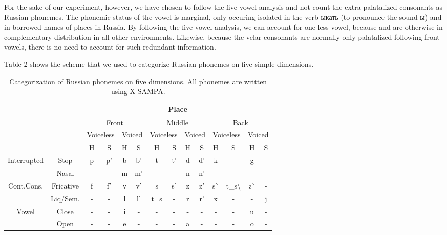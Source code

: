 \documentclass[11pt,a4paper]{article}
\begin{document}
For the sake of our experiment, however, we have chosen to follow the
five-vowel analysis and not count the extra palatalized consonants
as Russian phonemes. The phonemic status of the vowel \textipa{/\textbari/}
is marginal, only occuring isolated in the verb \foreignlanguage{russian}{ыкать}
(to pronounce the sound \foreignlanguage{russian}{ы}) and in borrowed names
of places in Russia. By following the five-vowel analysis, we can account for
one less vowel, because \textipa{/\textbari/} and  are otherwise
in complementary distribution in all other environments. Likewise, because
the velar consonants are normally only palatalized following front vowels,
there is no need to account for such redundant information.

Table 2 shows the scheme that we used to categorize Russian phonemes
on five simple dimensions.

\begin{table*}[t!]
\centering
\begin{tabular}{cccccccccccccc}
    \multicolumn{2}{c}{} & \multicolumn{12}{c}{Place}\\\hline
    \multicolumn{2}{c}{} & \multicolumn{4}{c}{Front} & \multicolumn{4}{c}{Middle} & \multicolumn{4}{c}{Back}\\\hline
    \multicolumn{2}{c}{} & \multicolumn{2}{c}{Voiceless} & \multicolumn{2}{c}{Voiced} & \multicolumn{2}{c}{Voiceless} & \multicolumn{2}{c}{Voiced} & \multicolumn{2}{c}{Voiceless} & \multicolumn{2}{c}{Voiced}\\\hline
    \multicolumn{2}{c}{} & H & S & H & S & H & S & H & S & H & S & H & S\\\hline
    \multirow{2}{50px}{Interrupted} & Stop & p & p' & b & b' & t & t' & d & d' & k & - & g & -\\
    & Nasal & - & - & m & m' & - & - & n & n' & - & - & - & - \\
    \multirow{2}{50px}{Cont.Cons.} & Fricative & f & f' & v & v' & s & s' & z & z' & s\` & t\_s\textbackslash & z\` & -\\
                                        & Liq/Sem. & - & - & l & l' & t\_s & - & r & r' & x & - & - & j\\
    \multirow{2}{50px}{Vowel} & Close & - & - & i & - & - & - & - & - & - & - & u & -\\
                              & Open & - & - & e & - & - & - & a & - & - & - & o & -\\
\end{tabular}
\caption{Categorization of Russian phonemes on five dimensions.
All phonemes are written using X-SAMPA.}
\end{table*}
\end{document}
